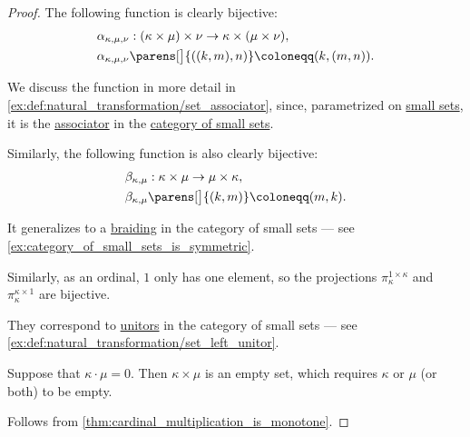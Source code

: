 \begin{proof}
   The following function is clearly bijective:
  \begin{equation*}
    \begin{aligned}
      &\alpha_{\kappa, \mu, \nu}: (\kappa \times \mu) \times \nu \to \kappa \times (\mu \times \nu), \\
      &\alpha_{\kappa, \mu, \nu}\parens[\big]{ ((k, m), n) } \coloneqq (k, (m, n)).
    \end{aligned}
  \end{equation*}

  We discuss the function in more detail in \cref{ex:def:natural_transformation/set_associator}, since, parametrized on \hyperref[def:small_set]{small sets}, it is the \hyperref[def:monoidal_category/associator]{associator} in the \hyperref[def:category_of_small_sets]{category of small sets}.

   Similarly, the following function is also clearly bijective:
  \begin{equation*}
    \begin{aligned}
      &\beta_{\kappa, \mu}: \kappa \times \mu \to \mu \times \kappa, \\
      &\beta_{\kappa, \mu}\parens[\big]{ (k, m) } \coloneqq (m, k).
    \end{aligned}
  \end{equation*}

  It generalizes to a \hyperref[def:symmetric_monoidal_category]{braiding} in the category of small sets --- see \cref{ex:category_of_small_sets_is_symmetric}.

   Similarly, as an ordinal, \( 1 \) only has one element, so the projections \( \pi_\kappa^{1 \times \kappa} \) and \( \pi_\kappa^{\kappa \times 1} \) are bijective.

  They correspond to \hyperref[def:monoidal_category/unitors]{unitors} in the category of small sets --- see \cref{ex:def:natural_transformation/set_left_unitor}.

   Suppose that \( \kappa \cdot \mu = 0 \). Then \( \kappa \times \mu \) is an empty set, which requires \( \kappa \) or \( \mu \) (or both) to be empty.

   Follows from \cref{thm:cardinal_multiplication_is_monotone}.
\end{proof}

